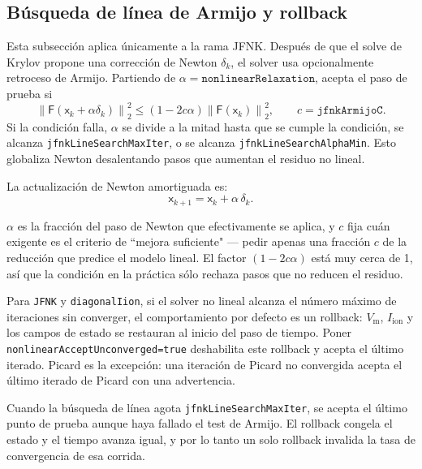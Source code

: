 \documentclass[11pt,a4paper]{article}
\newcommand{\code}[1]{\texttt{\small #1}}
\newcommand{\Vm}{V_{\text{m}}}
\newcommand{\Iion}{I_{\mathrm{ion}}}
\newcommand{\Fres}{\mathsf{F}}
\newcommand{\norm}[1]{\left\lVert #1 \right\rVert}
\begin{document}
\subsection{Búsqueda de línea de Armijo y rollback}
\label{sec:rollback}

Esta subsección aplica únicamente a la rama JFNK. Después de que el solve de Krylov propone una corrección de Newton $\delta_k$, el solver usa
opcionalmente retroceso de Armijo. Partiendo de $\alpha=\texttt{nonlinearRelaxation}$, acepta
el paso de prueba si
\begin{equation}
  \norm{\Fres(\mathsf{x}_k+\alpha\delta_k)}_2^2
  \le
  \left(1-2c\alpha\right)
  \norm{\Fres(\mathsf{x}_k)}_2^2,
  \qquad c=\texttt{jfnkArmijoC}.
  \label{eq:armijo}
\end{equation}
Si la condición falla, $\alpha$ se divide a la mitad hasta que se cumple la condición, se
alcanza \code{jfnkLineSearchMaxIter}, o se alcanza \code{jfnkLineSearchAlphaMin}. Esto
globaliza Newton desalentando pasos que aumentan el residuo no lineal.

La actualización de Newton amortiguada es:
$$
\mathsf{x}_{k+1}=\mathsf{x}_k+\alpha\,\delta_k.
$$

$\alpha$ es la fracción del paso de Newton que efectivamente se aplica, y $c$ fija cuán exigente es el criterio de ``mejora suficiente" — pedir apenas una fracción $c$ de la reducción que predice el modelo lineal. El factor $(1-2c\alpha)$ está muy cerca de 1, así que la condición en la práctica sólo rechaza pasos que no reducen el residuo.

Para \code{JFNK} y \code{diagonalIion}, si el solver no lineal alcanza el número máximo de
iteraciones sin converger, el comportamiento por defecto es un rollback: $\Vm$, $\Iion$ y los
campos de estado se restauran al inicio del paso de tiempo. Poner
\code{nonlinearAcceptUnconverged=true} deshabilita este rollback y acepta el último iterado.
Picard es la excepción: una iteración de Picard no convergida acepta el último iterado de Picard con una advertencia.

Cuando la búsqueda de línea agota \code{jfnkLineSearchMaxIter}, se acepta el último punto de prueba aunque haya fallado el test de Armijo.  El rollback congela el estado y el tiempo avanza igual, y por lo tanto un solo rollback invalida la tasa de convergencia de esa corrida.
\end{document}
